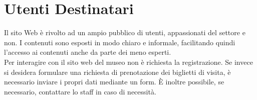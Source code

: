 \section{Utenti Destinatari}
Il sito Web è rivolto ad un ampio pubblico di utenti, appassionati del settore e non. I contenuti sono esposti in modo chiaro e informale, facilitando quindi l'accesso ai contenuti anche da parte dei meno esperti.\\
Per interagire con il sito web del museo non è richiesta la registrazione. Se invece si desidera formulare una richiesta di prenotazione dei biglietti di visita, è necessario inviare i propri dati mediante un form. È inoltre possibile, se necessario, contattare lo staff in caso di necessità.
